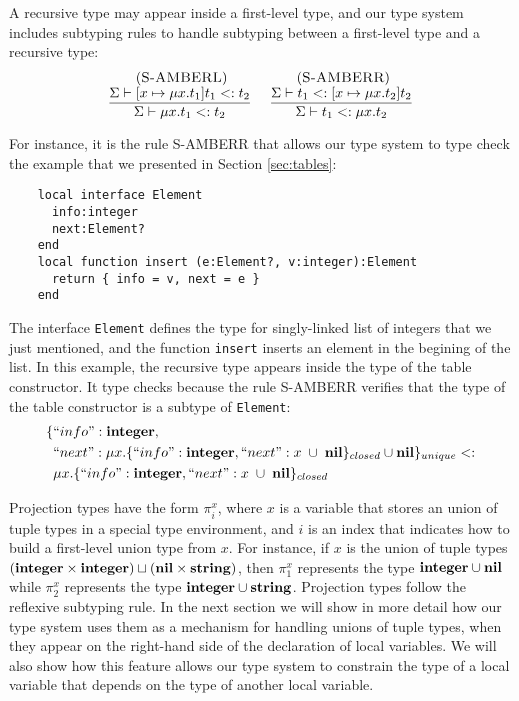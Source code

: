 A recursive type may appear inside a first-level type, and our
type system includes subtyping rules to handle subtyping between
a first-level type and a recursive type:
\[
\begin{array}{c}
\begin{array}{c}
\; (\textsc{S-AMBERL})\\
\dfrac{\Sigma \vdash [x \mapsto \mu x.t_{1}]t_{1} <: t_{2}}
      {\Sigma \vdash \mu x.t_{1} <: t_{2}}
\end{array}
\;
\begin{array}{c}
\; (\textsc{S-AMBERR})\\
\dfrac{\Sigma \vdash t_{1} <: [x \mapsto \mu x.t_{2}]t_{2}}
      {\Sigma \vdash t_{1} <: \mu x.t_{2}}
\end{array}
\end{array}
\]

For instance, it is the rule \textsc{S-AMBERR} that allows our
type system to type check the example that we presented
in Section \ref{sec:tables}:
\begin{verbatim}
    local interface Element
      info:integer
      next:Element?
    end
    local function insert (e:Element?, v:integer):Element
      return { info = v, next = e }
    end
\end{verbatim}

The interface \texttt{Element} defines the type for singly-linked
list of integers that we just mentioned, and the function
\texttt{insert} inserts an element in the begining of the list.
In this example, the recursive type appears inside the type of
the table constructor.
It type checks because the rule \textsc{S-AMBERR} verifies that
the type of the table constructor is a subtype of \texttt{Element}:
\begin{align*}
\{ & ``info":\mathbf{integer}, \\
   & ``next":\mu x.\{``info":\mathbf{integer}, ``next":x \;\cup\; \mathbf{nil}\}_{closed} \cup \mathbf{nil} \}_{unique} <: \\
& \mu x.\{``info":\mathbf{integer}, ``next":x \;\cup\; \mathbf{nil}\}_{closed}
\end{align*}

Projection types have the form $\pi_{i}^{x}$, where $x$ is a variable
that stores an union of tuple types in a special type environment,
and $i$ is an index that indicates how to build a first-level
union type from $x$.
For instance, if $x$ is the union of tuple types
$(\mathbf{integer} \times \mathbf{integer}) \sqcup (\mathbf{nil} \times \mathbf{string})$,
then $\pi_{1}^{x}$ represents the type $\mathbf{integer} \cup \mathbf{nil}$
while $\pi_{2}^{x}$ represents the type $\mathbf{integer} \cup \mathbf{string}$.
Projection types follow the reflexive subtyping rule.
In the next section we will show in more detail how our type system
uses them as a mechanism for handling unions of tuple types,
when they appear on the right-hand side of the declaration of local variables.
We will also show how this feature allows our type system to constrain
the type of a local variable that depends on the type of another local variable.

